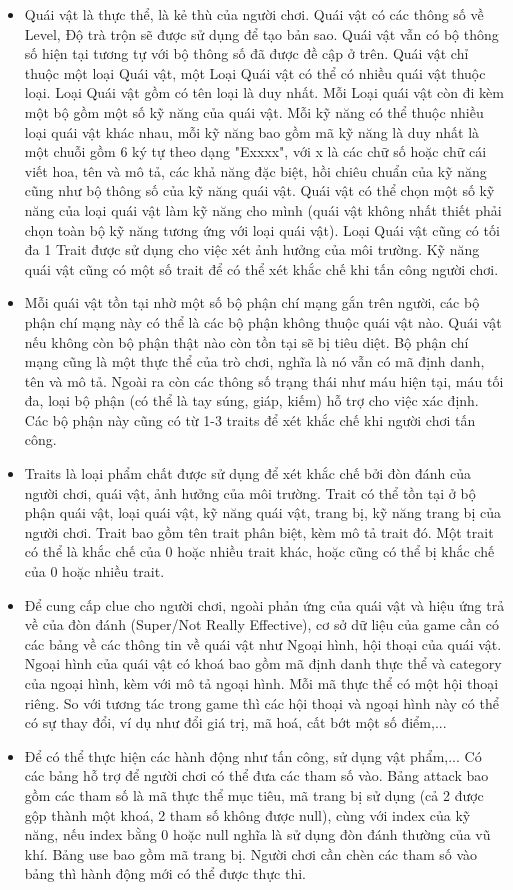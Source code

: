 \begin{itemize}
	\item Quái vật là thực thể, là kẻ thù của người chơi. Quái vật có các thông số về Level, Độ trà trộn sẽ được sử dụng để tạo bản sao. Quái vật vẫn có bộ thông số hiện tại tương tự với bộ thông số đã được đề cập ở trên. Quái vật chỉ thuộc một loại Quái vật, một Loại Quái vật có thể có nhiều quái vật thuộc loại. Loại Quái vật gồm có tên loại là duy nhất. Mỗi Loại quái vật còn đi kèm một bộ gồm một số kỹ năng của quái vật. Mỗi kỹ năng có thể thuộc nhiều loại quái vật khác nhau, mỗi kỹ năng bao gồm mã kỹ năng là duy nhất là một chuỗi gồm 6 ký tự theo dạng "Exxxx", với x là các chữ số hoặc chữ cái viết hoa, tên và mô tả, các khả năng đặc biệt, hồi chiêu chuẩn của kỹ năng cũng như bộ thông số của kỹ năng quái vật. Quái vật có thể chọn một số kỹ năng của loại quái vật làm kỹ năng cho mình (quái vật không nhất thiết phải chọn toàn bộ kỹ năng tương ứng với loại quái vật). Loại Quái vật cũng có tối đa 1 Trait được sử dụng cho việc xét ảnh hưởng của môi trường. Kỹ năng quái vật cũng có một số trait để có thể xét khắc chế khi tấn công người chơi. 
	\item Mỗi quái vật tồn tại nhờ một số bộ phận chí mạng gắn trên người, các bộ phận chí mạng này có thể là các bộ phận không thuộc quái vật nào. Quái vật nếu không còn bộ phận thật nào còn tồn tại sẽ bị tiêu diệt. Bộ phận chí mạng cũng là một thực thể của trò chơi, nghĩa là nó vẫn có mã định danh, tên và mô tả. Ngoài ra còn các thông số trạng thái như máu hiện tại, máu tối đa, loại bộ phận (có thể là tay súng, giáp, kiếm) hỗ trợ cho việc xác định. Các bộ phận này cũng có từ 1-3 traits để xét khắc chế khi người chơi tấn công. 
	\item Traits là loại phẩm chất được sử dụng để xét khắc chế bởi đòn đánh của người chơi, quái vật, ảnh hưởng của môi trường. Trait có thể tồn tại ở bộ phận quái vật, loại quái vật, kỹ năng quái vật, trang bị, kỹ năng trang bị của người chơi. Trait bao gồm tên trait phân biệt, kèm mô tả trait đó. Một trait có thể là khắc chế của 0 hoặc nhiều trait khác, hoặc cũng có thể bị khắc chế của 0 hoặc nhiều trait.
	\item Để cung cấp clue cho người chơi, ngoài phản ứng của quái vật và hiệu ứng trả về của đòn đánh (Super/Not Really Effective), cơ sở dữ liệu của game cần có các bảng về các thông tin về quái vật như Ngoại hình, hội thoại của quái vật. Ngoại hình của quái vật có khoá bao gồm mã định danh thực thể và category của ngoại hình, kèm với mô tả ngoại hình. Mỗi mã thực thể có một hội thoại riêng. So với tương tác trong game thì các hội thoại và ngoại hình này có thể có sự thay đổi, ví dụ như đổi giá trị, mã hoá, cất bớt một số điểm,...
	\item Để có thể thực hiện các hành động như tấn công, sử dụng vật phẩm,... Có các bảng hỗ trợ để người chơi có thể đưa các tham số vào. Bảng attack bao gồm các tham số là mã thực thể mục tiêu, mã trang bị sử dụng (cả 2 được gộp thành một khoá, 2 tham số không được null), cùng với index của kỹ năng, nếu index bằng 0 hoặc null nghĩa là sử dụng đòn đánh thường của vũ khí. Bảng use bao gồm mã trang bị. Người chơi cần chèn các tham số vào bảng thì hành động mới có thể được thực thi.
	
\end{itemize}
